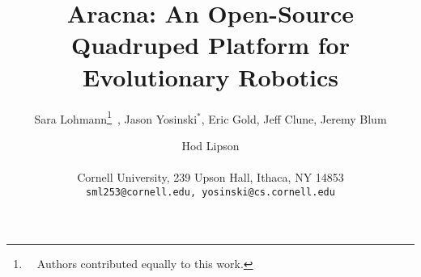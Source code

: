 \documentclass[letterpaper]{article}
\title{Aracna: An Open-Source Quadruped Platform for Evolutionary Robotics}
\author{Sara Lohmann\thanks{~~Authors contributed equally to this work.}~, Jason Yosinski$^{*}$, Eric Gold, Jeff Clune, Jeremy Blum \and Hod Lipson  \\
  \mbox{}\\
Cornell University, 239 Upson Hall, Ithaca, NY 14853 \\
\texttt{sml253@cornell.edu, yosinski@cs.cornell.edu}}
\begin{document}
\maketitle


\begin{abstract}

\end{abstract}
























\footnotesize


\end{document}
